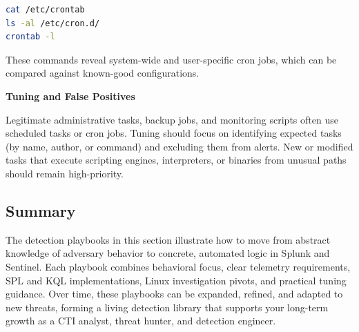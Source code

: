 \begin{lstlisting}[language=bash]
cat /etc/crontab
ls -al /etc/cron.d/
crontab -l
\end{lstlisting}

These commands reveal system-wide and user-specific cron jobs, which can be compared against known-good configurations.

\textbf{Tuning and False Positives}

Legitimate administrative tasks, backup jobs, and monitoring scripts often use scheduled tasks or cron jobs. Tuning should 
focus on identifying expected tasks (by name, author, or command) and excluding them from alerts. New or modified tasks that 
execute scripting engines, interpreters, or binaries from unusual paths should remain high-priority.

\subsection*{Summary}

The detection playbooks in this section illustrate how to move from abstract knowledge of adversary behavior to concrete, 
automated logic in Splunk and Sentinel. Each playbook combines behavioral focus, clear telemetry requirements, SPL and KQL 
implementations, Linux investigation pivots, and practical tuning guidance. Over time, these playbooks can be expanded, refined, 
and adapted to new threats, forming a living detection library that supports your long-term growth as a CTI analyst, 
threat hunter, and detection engineer.
